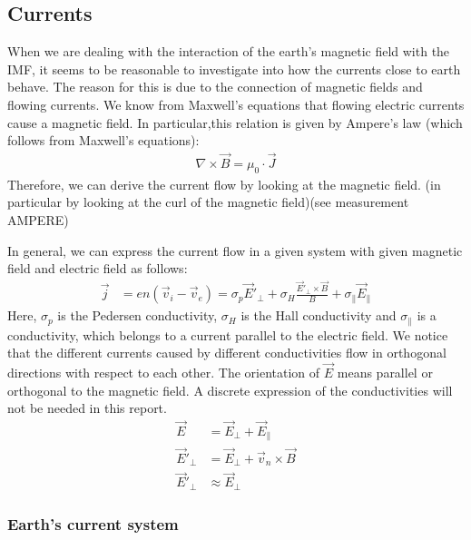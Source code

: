 \documentclass[10pt,a4paper]{article}
\begin{document}
\subsection{Currents \label{_CHAP_THEO_currents}}

When we are dealing with the interaction of the earth's magnetic field with the IMF, it seems to be reasonable to investigate into how the currents close to earth behave. 
The reason for this is due to the connection of magnetic fields and flowing currents. We know from Maxwell's equations that flowing electric currents cause a magnetic field. In particular,this relation is given by Ampere's law (which follows from Maxwell's equations):
\begin{align}
\nabla \times \vec{B}= \mu_0 \cdot \vec{J}
\end{align} 
Therefore, we can derive the current flow by looking at the magnetic field. (in particular by looking at the curl of the magnetic field)(see measurement AMPERE)

In general, we can express the current flow in a given system with given magnetic field and electric field as follows:
\begin{align}
\vec{j}&= e n ( \vec{v}_i - \vec{v}_e ) = \sigma_p \vec{E}'_{\perp} + \sigma_H \frac{\vec{E}'_{\perp} \times \vec{B}}{B} + \sigma_{\parallel} \vec{E}_{\parallel}
\end{align}
Here, $\sigma_p$ is the Pedersen conductivity, $\sigma_H$ is the Hall conductivity and $\sigma_{\parallel}$ is a conductivity, which belongs to a current parallel to the electric field. We notice that the different currents caused by different conductivities flow in orthogonal directions with respect to each other. The orientation of $\vec{E}$ means parallel or orthogonal to the magnetic field. A discrete expression of the conductivities will not be needed in this report. 
\begin{align}
\vec{E}&= \vec{E}_{\perp} +\vec{E}_{\parallel}\\
\vec{E}'_{\perp}&=\vec{E}_{\perp}+ \vec{v}_n \times \vec{B}\\
\vec{E}'_{\perp}& \approx \vec{E}_{\perp}
\end{align}

\subsubsection{Earth's current system \label{_CHAP_THEO_currentsystem earth}}
\end{document}
